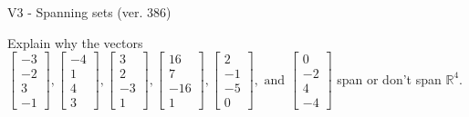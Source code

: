 \begin{exercise}
  \begin{exerciseTitle}V3 - Spanning sets (ver. 386)\end{exerciseTitle}
  \begin{exerciseStatement}
    Explain why the vectors \(\left[\begin{array}{r}
-3 \\
-2 \\
3 \\
-1
\end{array}\right] , \left[\begin{array}{r}
-4 \\
1 \\
4 \\
3
\end{array}\right] , \left[\begin{array}{r}
3 \\
2 \\
-3 \\
1
\end{array}\right] , \left[\begin{array}{r}
16 \\
7 \\
-16 \\
1
\end{array}\right] , \left[\begin{array}{r}
2 \\
-1 \\
-5 \\
0
\end{array}\right] , \text{ and } \left[\begin{array}{r}
0 \\
-2 \\
4 \\
-4
\end{array}\right]\) span or don't span \(\mathbb{R}^4\). 
	



\end{exerciseStatement}
\end{exercise}
